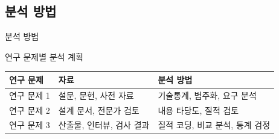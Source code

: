 \subsection{분석 방법}
\begin{frame}[t]{분석 방법}
\small

\begin{block}{연구 문제별 분석 계획}
\begin{tabular}{p{}p{}p{}}

\toprule
연구 문제 & 자료 & 분석 방법 \\
\midrule

연구 문제 1 & 설문, 문헌, 사전 자료 & 기술통계, 범주화, 요구 분석 \\
연구 문제 2 & 설계 문서, 전문가 검토 & 내용 타당도, 질적 검토 \\
연구 문제 3 & 산출물, 인터뷰, 검사 결과 & 질적 코딩, 비교 분석, 통계 검정 \\
\bottomrule
\end{tabular}
\end{block}

\end{frame}
